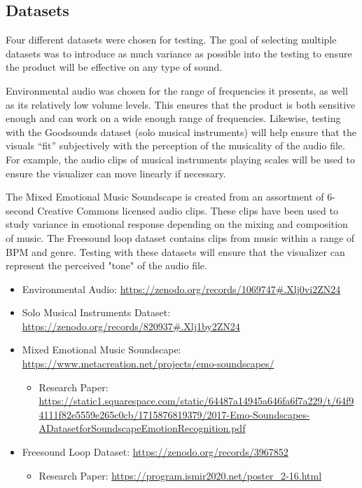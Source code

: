 \documentclass{article}
\begin{document}
\subsection{Datasets}

Four different datasets were chosen for testing. The goal of selecting multiple datasets was to introduce as much variance as possible into the testing to ensure the product will be effective on any type of sound. \newline

Environmental audio was chosen for the range of frequencies it presents, as well as its relatively low volume levels. This ensures that the product is both sensitive enough and can work on a wide enough range of frequencies. Likewise, testing with the Goodsounds dataset (solo musical instruments) will help ensure that the visuals “fit” subjectively with the perception of the musicality of the audio file. For example, the audio clips of musical instruments playing scales will be used to ensure the visualizer can move linearly if necessary. \newline

The Mixed Emotional Music Soundscape is created from an assortment of 6-second Creative Commons licensed audio clips. These clips have been used to study variance in emotional response depending on the mixing and composition of music. The Freesound loop dataset contains clips from music within a range of BPM and genre. Testing with these datasets will ensure that the visualizer can represent the perceived "tone" of the audio file. \newline

\begin{itemize}
    \item Environmental Audio: \url{https://zenodo.org/records/1069747#.Xlj0vi2ZN24}
    \item Solo Musical Instruments Dataset: \url{https://zenodo.org/records/820937#.Xlj1by2ZN24}
    \item Mixed Emotional Music Soundscape: \url{https://www.metacreation.net/projects/emo-soundscapes/}
    \begin{itemize}
        \item Research Paper: \url{https://static1.squarespace.com/static/64487a14945a646fa6f7a229/t/64f94111f82e5559e265c0cb/1715876819379/2017-Emo-Soundscapes-ADatasetforSoundscapeEmotionRecognition.pdf}
    \end{itemize}
    \item Freesound Loop Dataset: \url{https://zenodo.org/records/3967852}
    \begin{itemize}
        \item Research Paper: \url{https://program.ismir2020.net/poster_2-16.html}
    \end{itemize}
\end{itemize}
\end{document}
